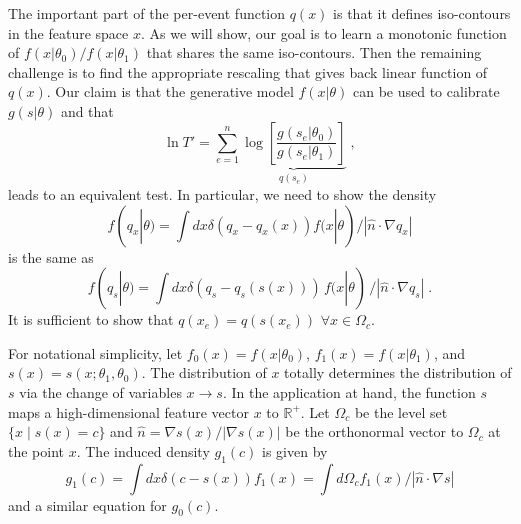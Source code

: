 \documentclass[11pt, oneside]{article}   	%
\begin{document}
The important part of the per-event function $q(x)$ is that it defines iso-contours in the feature space $x$. As we will show, our goal is to learn a monotonic function of $f(x|\theta_0)/f(x|\theta_1)$ that shares the same iso-contours. Then the remaining challenge is to find the appropriate rescaling that gives back  linear function of $q(x)$. Our claim is that the generative model $f(x|\theta)$ can be used to calibrate $g(s|\theta)$ and that
\begin{equation}
\ln T' = \sum_{e=1}^n \underbrace{\log \left[ \frac {g(s_e | \theta_0) }{ g(s_e | \theta_1) } \right]}_{q(s_e)} \;,
\end{equation}
leads to an equivalent test. In particular, we need to show the density
\begin{equation}
f(q_x|\theta) = \int dx \delta(q_x-q_x(x)) f(x|\theta)  / | \hat{n} \cdot \nabla q_x  | 
\end{equation}
is the same as
\begin{equation}
f(q_s|\theta) = \int dx \delta(q_s-q_s(s(x))) \, f(x|\theta) \, / | \hat{n} \cdot \nabla q_s  | \; .
\end{equation}
It is sufficient to show that $q(x_e) = q(s(x_e))$ $ \forall x\in\Omega_c$.


For notational simplicity, let $f_0(x) = f(x|\theta_0)$, $f_1(x) = f(x|\theta_1)$, and $s(x)=s(x; \theta_1, \theta_0)$.
The distribution of $x$ totally determines the distribution of $s$ via the change of variables $x\to s$. 
In the application at hand, the function $s$ maps a high-dimensional feature vector $x$ to $\mathbb{R}^+$.
Let $\Omega_{c}$ be the level set $\{x \mid s(x) = c \}$ and $\hat{n}=\nabla s(x) / |\nabla s(x)|$ be the orthonormal vector to $\Omega_c$ at the point $x$. The induced density $g_1(c)$ is given by 
\begin{equation}
g_1(c) = \int dx \delta(c-s(x)) f_1(x) = \int d\Omega_c f_1(x)  / | \hat{n} \cdot \nabla s  |
\end{equation}
and a similar equation for $g_0(c)$. 
\end{document}
